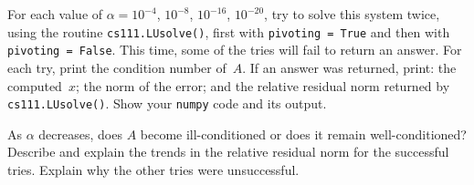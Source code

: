 \documentclass[11pt]{article}
\begin{document}
For each value of $\alpha = 10^{-4}$, $10^{-8}$, $10^{-16}$, $10^{-20}$,
try to solve this system twice, using the routine {\tt cs111.LUsolve()},
first with {\tt pivoting = True} and then with {\tt pivoting = False}.
This time, some of the tries will fail to return an answer.
For each try, print the condition number of~$A$.
If an answer was returned, print:
the computed~$x$; the norm of the error; 
and the relative residual norm returned by {\tt cs111.LUsolve()}.
Show your {\tt numpy} code and its output.

As $\alpha$ decreases, does $A$ become ill-conditioned or does it remain well-conditioned?
Describe and explain the trends in the relative residual norm 
for the successful tries.
Explain why the other tries were unsuccessful.
\end{document}

